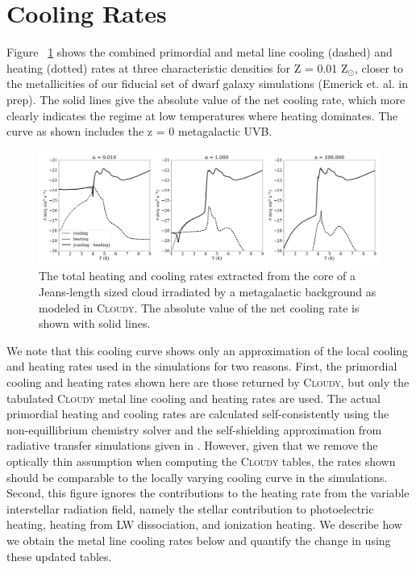 \documentclass[twocolumn]{aastex61}
\begin{document}
\section{Cooling Rates}
\label{appendix:cooling}
Figure ~\ref{fig:cooling} shows the combined primordial and metal line cooling (dashed) and heating (dotted) rates at three characteristic densities for Z = 0.01 Z$_{\odot}$, closer to the metallicities of our fiducial set of dwarf galaxy simulations (Emerick et. al. in prep). The solid lines give the absolute value of the net cooling rate, which more clearly indicates the regime at low temperatures where heating dominates. The curve as shown includes the z = 0 \cite{HM2012} metagalactic UVB.

\begin{figure}
\centering
\includegraphics[width=0.95\linewidth]{cooling_curve}
\caption{The total heating and cooling rates extracted from the core of a Jeans-length sized cloud irradiated by a \cite{HM2012} metagalactic background as modeled in \textsc{Cloudy}. The absolute value of the net cooling rate is shown with solid lines.}
\label{fig:cooling}
\end{figure}

We note that this cooling curve shows only an approximation of the local cooling and heating rates used in the simulations for two reasons. First, the primordial cooling and heating rates shown here are those returned by \textsc{Cloudy}, but only the tabulated \textsc{Cloudy} metal line cooling and heating rates are used. The actual primordial heating and cooling rates are calculated self-consistently using the non-equillibrium chemistry solver and the self-shielding approximation from radiative transfer simulations given in \cite{Rahmati2013}. However, given that we remove the optically thin assumption when computing the \textsc{Cloudy} tables, the rates shown should be comparable to the locally varying cooling curve in the simulations. Second, this figure ignores the contributions to the heating rate from the variable interstellar radiation field, namely the stellar contribution to photoelectric heating, heating from LW dissociation, and ionization heating. We describe how we obtain the metal line cooling rates below and quantify the change in using these updated tables. 
\end{document}
